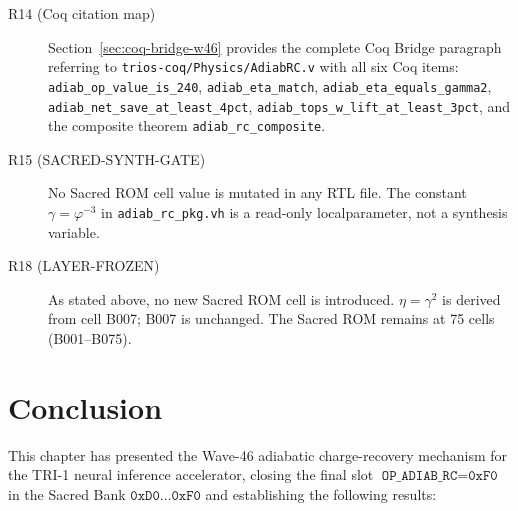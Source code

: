 \begin{description}
  \item[R14 (Coq citation map)] Section~\ref{sec:coq-bridge-w46} provides the
        complete Coq Bridge paragraph referring to
        \texttt{trios-coq/Physics/AdiabRC.v} with all six Coq items:
        \texttt{adiab\_op\_value\_is\_240},
        \texttt{adiab\_eta\_match},
        \texttt{adiab\_eta\_equals\_gamma2},
        \texttt{adiab\_net\_save\_at\_least\_4pct},
        \texttt{adiab\_tops\_w\_lift\_at\_least\_3pct},
        and the composite theorem \texttt{adiab\_rc\_composite}.

  \item[R15 (SACRED-SYNTH-GATE)] No Sacred ROM cell value is mutated in any
        RTL file.
        The constant $\gamma = \varphi^{-3}$ in \texttt{adiab\_rc\_pkg.vh}
        is a read-only localparameter, not a synthesis variable.

  \item[R18 (LAYER-FROZEN)] As stated above, no new Sacred ROM cell is
        introduced.
        $\eta = \gamma^{2}$ is derived from cell B007; B007 is unchanged.
        The Sacred ROM remains at 75 cells (B001--B075).
\end{description}

\section{Conclusion}
\label{sec:conclusion-w46}

This chapter has presented the Wave-46 adiabatic charge-recovery mechanism for
the TRI-1 neural inference accelerator, closing the final slot
$\texttt{OP\_ADIAB\_RC} = \texttt{0xF0}$ in the Sacred Bank
$\texttt{0xD0}\ldots\texttt{0xF0}$ and establishing the following results:

